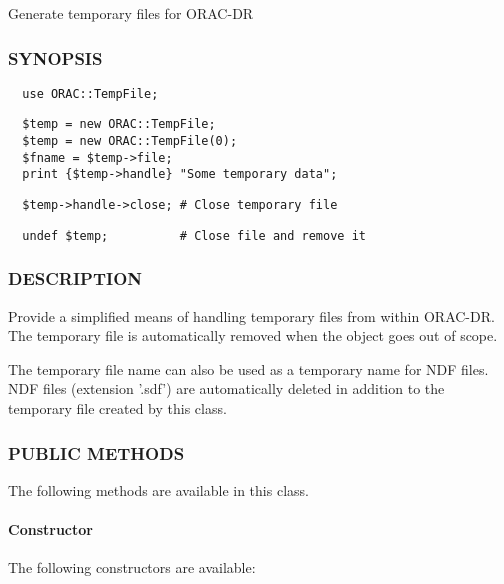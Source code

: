 Generate temporary files for ORAC-DR

\subsubsection*{SYNOPSIS\label{ORAC::TempFile_SYNOPSIS}}
\begin{verbatim}
  use ORAC::TempFile;
\end{verbatim}
\begin{verbatim}
  $temp = new ORAC::TempFile;
  $temp = new ORAC::TempFile(0);
  $fname = $temp->file;
  print {$temp->handle} "Some temporary data";
\end{verbatim}
\begin{verbatim}
  $temp->handle->close; # Close temporary file
\end{verbatim}
\begin{verbatim}
  undef $temp;          # Close file and remove it
\end{verbatim}
\subsubsection*{DESCRIPTION\label{ORAC::TempFile_DESCRIPTION}}


Provide a simplified means of handling temporary files from within
ORAC-DR. The temporary file is automatically removed when the
object goes out of scope.



The temporary file name can also be used as a temporary name for
NDF files. NDF files (extension '.sdf') are automatically deleted
in addition to the temporary file created by this class.

\subsubsection*{PUBLIC METHODS\label{ORAC::TempFile_PUBLIC_METHODS}}


The following methods are available in this class.

\paragraph*{Constructor\label{ORAC::TempFile_Constructor}}


The following constructors are available:

